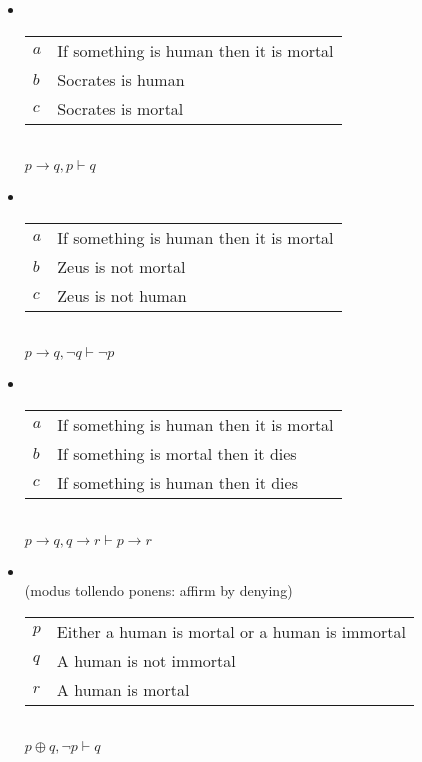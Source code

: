 \documentclass[headrule,footrule]{foils}
\begin{document}

\begin{itemize}
\item {}
\\[2ex]
  \begin{tabular}{ll}
    $a$ & If something is human then it is mortal \\
    $b$ & Socrates is human \\ \hline
    $c$ & Socrates is mortal
  \end{tabular}
\\ $p \rightarrow q, p \vdash q$
\item {}
\\[2ex]
  \begin{tabular}{ll}
    $a$ & If something is human then it is mortal \\
    $b$ & Zeus is not mortal \\ \hline
    $c$ & Zeus is not human
  \end{tabular}
\\ $p \rightarrow q, \neg q \vdash \neg p$

\newpage
\item {}
\\[2ex]
 \begin{tabular}{ll}
    $a$ & If something is human then it is mortal \\
    $b$ & If something is mortal then it dies \\ \hline
    $c$ & If something is human then it dies
  \end{tabular}
\\ $p \rightarrow q, q \rightarrow r \vdash p \rightarrow r$
\item {}
\\ (modus tollendo ponens: affirm by denying)
\\[2ex]
 \begin{tabular}{ll}
    $p$ & Either a human is mortal or a human is immortal \\
    $q$ & A human is not immortal \\ \hline
    $r$ & A human is mortal
  \end{tabular}
\\ $p \oplus q, \neg p \vdash q$
\end{itemize}
\end{document}
